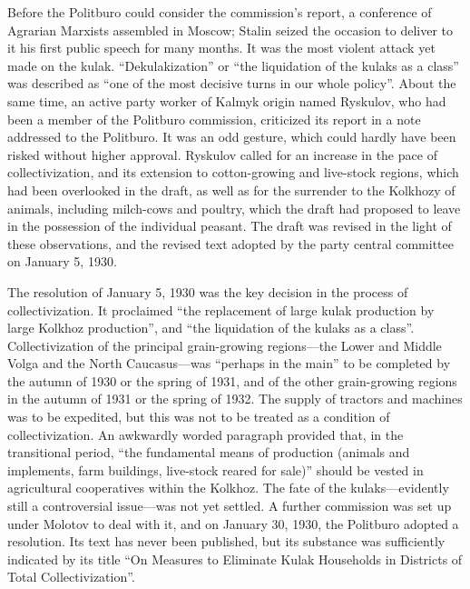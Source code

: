Before the Politburo could consider the commission's report, a conference of Agrarian Marxists assembled in Moscow; Stalin seized the occasion to deliver to it his first public speech for many months. It was the most violent attack yet made on the kulak. ``Dekulakization'' or ``the liquidation of the kulaks as a class'' was described as ``one of the most decisive turns in our whole policy''. About the same time, an active party worker of Kalmyk origin named Ryskulov, who had been a member of the Politburo commission, criticized its report in a note addressed to the Politburo. It was an odd gesture, which could hardly have been risked without higher approval. Ryskulov called for an increase in the pace of collectivization, and its extension to cotton-growing and live-stock regions, which had been overlooked in the draft, as well as for the surrender to the Kolkhozy of animals, including milch-cows and poultry, which the draft had proposed to leave in the possession of the individual peasant. The draft was revised in the light of these observations, and the revised text adopted by the party central committee on January 5, 1930. 

The resolution of January 5, 1930 was the key decision in the process of collectivization. It proclaimed ``the replacement of large kulak production by large Kolkhoz production'', and ``the liquidation of the kulaks as a class''. Collectivization of the principal grain-growing regions---the Lower and Middle Volga and the North Caucasus---was ``perhaps in the main'' to be completed by the autumn of 1930 or the spring of 1931, and of the other grain-growing regions in the autumn of 1931 or the spring of 1932. The supply of tractors and machines was to be expedited, but this was not to be treated as a condition of collectivization. An awkwardly worded paragraph provided that, in the transitional period, ``the fundamental means of production (animals and implements, farm buildings, live-stock reared for sale)'' should be vested in agricultural cooperatives within the Kolkhoz. The fate of the kulaks---evidently still a controversial issue---was not yet settled. A further commission was set up under Molotov to deal with it, and on January 30, 1930, the Politburo adopted a resolution. Its text has never been published, but its substance was sufficiently indicated by its title ``On Measures to Eliminate Kulak Households in Districts of Total Collectivization''. 

